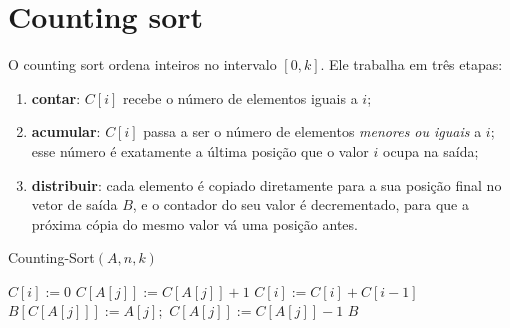 \section{Counting sort}\label{sec:counting}
O counting sort ordena inteiros no intervalo $[0,k]$. Ele trabalha em três etapas:
\begin{enumerate}
  \item \textbf{contar}: $C[i]$ recebe o número de elementos iguais a $i$;
  \item \textbf{acumular}: $C[i]$ passa a ser o número de elementos \emph{menores ou iguais} a $i$; esse número é exatamente a última posição que o valor $i$ ocupa na saída;
  \item \textbf{distribuir}: cada elemento é copiado diretamente para a sua posição final no vetor de saída $B$, e o contador do seu valor é decrementado, para que a próxima cópia do mesmo valor vá uma posição antes.
\end{enumerate}
\begin{pseudo}{Counting-Sort$(A,n,k)$}
\begin{algorithmic}
 \State $C[i]:=0$ \EndFor
{}  \State $C[A[j]]:=C[A[j]]+1$ \EndFor
{}  \State $C[i]:=C[i]+C[i-1]$ \EndFor
{} 
  \State $B[C[A[j]]]:=A[j]$;\ $C[A[j]]:=C[A[j]]-1$
\EndFor
\State \Return $B$
\end{algorithmic}
\end{pseudo}

